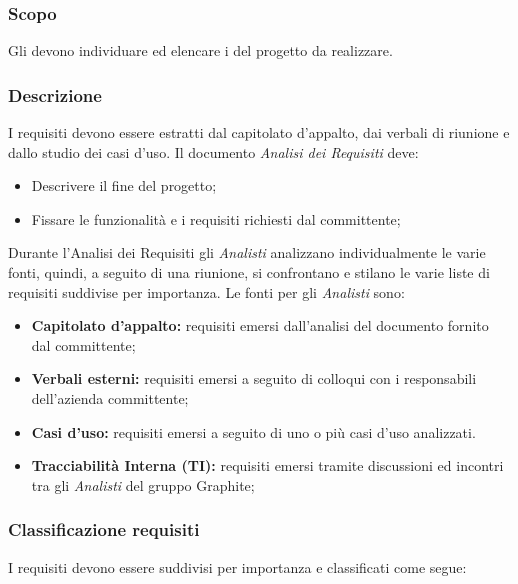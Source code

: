 \documentclass[../NomeDocumento.tex]{subfiles}
\begin{document}
	\subsubsection{Scopo} 
	
	Gli  devono individuare ed elencare i  del progetto da realizzare.
	
	\subsubsection{Descrizione}
	
	I requisiti devono essere estratti dal capitolato d’appalto, dai verbali di riunione e dallo studio dei casi d’uso. Il documento \textit{Analisi dei Requisiti} deve:
	
	\begin{itemize}
		\item Descrivere il fine del progetto;
		\item Fissare le funzionalità e i requisiti richiesti dal committente;
	\end{itemize}

	\noindent Durante l’Analisi dei Requisiti gli \textit{Analisti} analizzano individualmente le varie fonti, quindi, a seguito di una riunione, si confrontano e stilano le varie liste di requisiti suddivise per importanza. Le fonti per gli \textit{Analisti} sono:
	 
	\begin{itemize}
		\item \textbf{Capitolato d’appalto:} requisiti emersi dall’analisi del documento fornito dal committente;
		\item \textbf{Verbali esterni:} requisiti emersi a seguito di colloqui con i responsabili dell’azienda committente;
		\item \textbf{Casi d'uso:} requisiti emersi a seguito di uno o più casi d’uso analizzati.
		\item \textbf{Tracciabilità Interna (TI):} requisiti emersi tramite discussioni ed incontri tra gli \textit{Analisti} del gruppo Graphite;
	\end{itemize}

	\subsubsection{Classificazione requisiti} 
	
	I requisiti devono essere suddivisi per importanza e classificati come segue:
	
\end{document}
